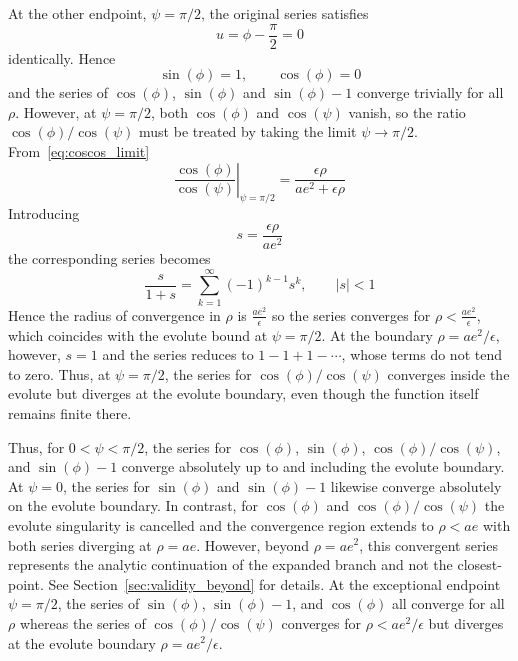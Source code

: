 \documentclass[a4paper]{amsart}
\begin{document}
At the other endpoint, $\psi=\pi/2$, the original series satisfies
\begin{equation*}
u=\phi-\frac{\pi}{2}=0
\end{equation*}
identically. Hence
\begin{equation*}
\sin(\phi)=1,
\qquad
\cos(\phi)=0
\end{equation*}
and the series of $\cos(\phi)$, $\sin(\phi)$ and $\sin(\phi)-1$ converge trivially for all $\rho$. However, at $\psi=\pi/2$, both $\cos(\phi)$ and $\cos(\psi)$ vanish, so the ratio $\cos(\phi)/\cos(\psi)$ must be treated by taking the limit $\psi\to\pi/2$. From~\eqref{eq:coscos_limit}
\begin{equation*}
\left.\frac{\cos(\phi)}{\cos(\psi)}\right|_{\psi=\pi/2}
=
\frac{\epsilon\rho}{ae^2+\epsilon\rho}
\end{equation*}
Introducing
\begin{equation*}
s=\frac{\epsilon\rho}{ae^2}
\end{equation*}
the corresponding series becomes
\begin{equation*}
\frac{s}{1+s}
=
\sum_{k=1}^{\infty}(-1)^{k-1}s^k,
\qquad |s|<1
\end{equation*}
Hence the radius of convergence in $\rho$ is $\frac{ae^2}{\epsilon}$ so the series converges for $\rho<\frac{ae^2}{\epsilon}$, which coincides with the evolute bound at $\psi=\pi/2$. At the boundary $\rho=ae^2/\epsilon$, however, $s=1$ and the series reduces to $1-1+1-\cdots$, whose terms do not tend to zero. Thus, at $\psi=\pi/2$, the series for $\cos(\phi)/\cos(\psi)$ converges inside the evolute but diverges at the evolute boundary, even though the function itself remains finite there.

Thus, for $0<\psi<\pi/2$, the series for $\cos(\phi)$, $\sin(\phi)$, $\cos(\phi)/\cos(\psi)$, and $\sin(\phi)-1$ converge absolutely up to and including the evolute boundary.
%
At $\psi=0$, the series for $\sin(\phi)$ and $\sin(\phi)-1$ likewise converge absolutely on the evolute boundary. In contrast, for $\cos(\phi)$ and $\cos(\phi)/\cos(\psi)$ the evolute singularity is cancelled and the convergence region extends to $\rho<ae$ with both series diverging at $\rho=ae$. However, beyond $\rho=ae^2$, this convergent series represents the analytic continuation of the expanded branch and not the closest-point. See Section~\ref{sec:validity_beyond} for details.
%
At the exceptional endpoint $\psi=\pi/2$, the series of $\sin(\phi)$, $\sin(\phi)-1$, and $\cos(\phi)$ all converge for all $\rho$ whereas the series of $\cos(\phi)/\cos(\psi)$ converges for $\rho<ae^2/\epsilon$ but diverges at the evolute boundary $\rho=ae^2/\epsilon$.
\end{document}
